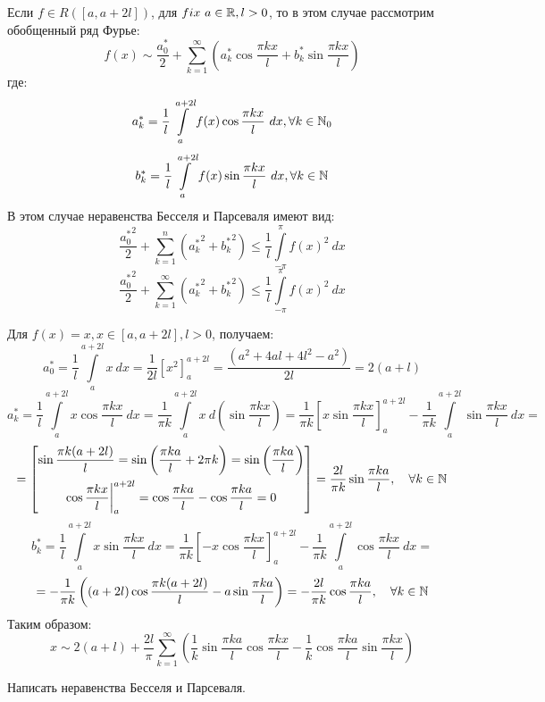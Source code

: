 \documentclass[../../main.tex]{subfiles}
\begin{document}
	Если  $f \in R\left( [a,a+2l]\right) $, для $fix \ a \in \mathbb{R}, l > 0$, то в этом случае рассмотрим обобщенный ряд Фурье:
	\begin{equation}
	\label{17:25}
	 f(x) \sim \frac{a_0^*}{2} + \sum_{k=1}^{\infty} \left( a_k^* \cos{\frac{\pi k x}{l}} + b_k^* \sin{\frac{\pi k x}{l}} \right)
	\end{equation}
	где:
	\begin{equation}
	\label{17:26}
	a_k^* = \frac{1}{l} \int\limits_{a}^{a+2l} f(x) \cos{\frac{\pi k x}{l}} \ dx, \forall k \in \mathbb{N}_0
	\end{equation}
	\begin{equation}
	\label{17:27}
	b_k^* = \frac{1}{l} \int\limits_{a}^{a+2l} f(x) \sin{\frac{\pi k x}{l}} \ dx, \forall k \in \mathbb{N}
	\end{equation}
	В этом случае неравенства Бесселя и Парсеваля имеют вид:
	\begin{equation}
	\label{17:28}
	\frac{{a_0^*}^2}{2} + \sum_{k=1}^{n} \left( {a_k^*}^2 + {b_k^*}^2\right) \le \frac{1}{l}  \int\limits_{-\pi}^{\pi} f(x)^2 \ dx
	\end{equation}
	\begin{equation}
	\label{17:29}
	\frac{{a_0^*}^2}{2} + \sum_{k=1}^{\infty} \left( {a_k^*}^2 + {b_k^*}^2\right) \le \frac{1}{l}  \int\limits_{-\pi}^{\pi} f(x)^2 \ dx
	\end{equation}
	\begin{exmp}
	Для $f(x) = x, x \in [a,a+2l], l > 0$, получаем:
	\[ a_0^* = \frac{1}{l} \int\limits_{a}^{a+2l} x \ dx = \frac{1}{2l} \left[x^2 \right]_{a}^{a+2l} = \frac{\left( a^2 + 4al + 4l^2 - a^2 \right) }{2l}=2(a+l)  \]
	\[  a_k^* = \frac{1}{l} \int\limits_{a}^{a+2l} x \cos{\frac{\pi k x}{l}} \ dx = \frac{1}{\pi k}  \int\limits_{a}^{a+2l} x \ d \left(\sin{\frac{\pi k x}{l}} \right) = \frac{1}{\pi k} \left[ x \sin{\frac{\pi k x}{l}} \right]_{a}^{a+2l} - \frac{1}{\pi k} \int\limits_{a}^{a+2l} \sin{\frac{\pi k x}{l}} \ dx =            \]
	\[ = \left[ \begin{gathered} 
	\sin{\frac{\pi k (a+2l)}{l}} = \sin{\left( \frac{\pi k a}{l} + 2\pi k\right)} = \sin{\left( \frac{\pi k a}{l} \right)}  \\
	\cos{ \frac{\pi k x}{l} } \bigg|_{a}^{a+2l} = \cos{ \frac{\pi k a}{l} } - \cos{ \frac{\pi k a}{l} } = 0
	\end{gathered}\right] =\frac{2l}{\pi k} \sin{\frac{\pi k a}{l}}, \quad \forall k \in \mathbb{N}     \]
	\[  b_k^* = \frac{1}{l} \int\limits_{a}^{a+2l} x \sin{\frac{\pi k x}{l}} \ dx = \frac{1}{\pi k} \left[ - x \cos{\frac{\pi k x}{l}} \right]_{a}^{a+2l} - \frac{1}{\pi k} \int\limits_{a}^{a+2l} \cos{\frac{\pi k x}{l}} \ dx =            \]
	\[= - \frac{1}{\pi k} \left( \left(a+2l \right)\cos{\frac{\pi k (a+2l)}{l}} - a \sin{\frac{\pi k a}{l}} \right)  = -\frac{2l}{\pi k} \cos{\frac{\pi k a}{l}}, \quad \forall k \in \mathbb{N}     \]
	Таким образом:
	\[ x \sim 2(a+l) + \frac{2l}{\pi} \sum_{k=1}^{\infty}\left(  \frac{1}{k} \sin{\frac{\pi k a}{l}} \cos{\frac{\pi k x}{l}} - \frac{1}{k} \cos{\frac{\pi k a}{l}} \sin{\frac{\pi k x}{l}} \right)        \]
	\end{exmp}	
	\begin{exercise}
		Написать неравенства Бесселя и Парсеваля.
	\end{exercise}	
\end{document}
